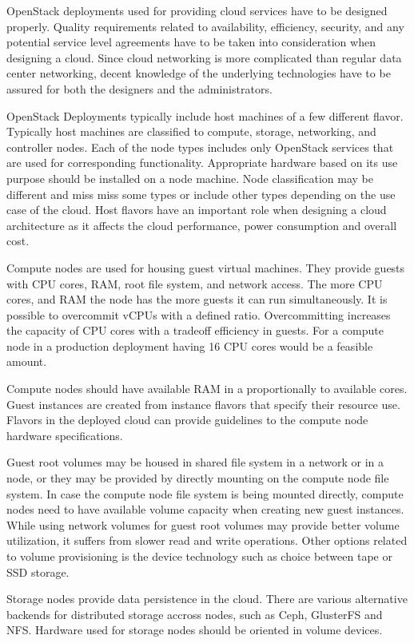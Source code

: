 \documentclass[officiallayout]{tktla}
\begin{document}
OpenStack deployments used for providing cloud services have to be designed
properly. Quality requirements related to availability, efficiency, security,
and any potential service level agreements have to be taken into consideration
when designing a cloud. Since cloud networking is more complicated than regular
data center networking, decent knowledge of the underlying technologies have to
be assured for both the designers and the administrators.

OpenStack Deployments typically include host machines of a few different
flavor. Typically host machines are classified to compute, storage, networking,
and controller nodes. Each of the node types includes only OpenStack services
that are used for corresponding functionality. Appropriate hardware based on
its use purpose should be installed on a node machine. Node  classification may
be different and miss miss some types or include other types depending on the
use case of the cloud. Host flavors have an important role when designing a
cloud architecture as it affects the cloud performance, power consumption and
overall cost.

Compute nodes are used for housing guest virtual machines. They provide guests
with CPU cores, RAM, root file system, and network access. The more CPU cores,
and RAM the node has the more guests it can run simultaneously. It is possible
to overcommit vCPUs with a defined ratio. Overcommitting increases the capacity
of CPU cores with a tradeoff efficiency in guests. For a compute node in a
production deployment having 16 CPU cores would be a feasible amount.

Compute nodes should have available RAM in a proportionally to available cores.
Guest instances are created from instance flavors that specify their resource
use. Flavors in the deployed cloud can provide guidelines to the compute node
hardware specifications.

Guest root volumes may be housed in shared file system in a network or in a
node, or they may be provided by directly mounting on the compute node file
system. In case the compute node file system is being mounted directly, compute
nodes need to have available volume capacity when creating new guest instances.
While using network volumes for guest root volumes may provide better volume
utilization, it suffers from slower read and write operations. Other options
related to volume provisioning is the device technology such as choice between
tape or SSD storage.

Storage nodes provide data persistence in the cloud. There are various
alternative backends for distributed storage accross nodes, such as Ceph,
GlusterFS and NFS. Hardware used for storage nodes should be oriented in volume
devices.
\end{document}

